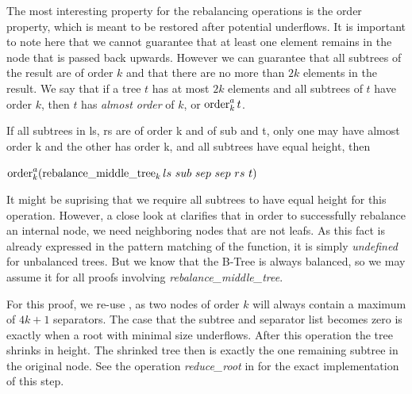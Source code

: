 The most interesting property for the rebalancing operations is the order property,
which is meant to be restored after potential underflows.
It is important to note here that we cannot guarantee
that at least one element remains in the node that
is passed back upwards.
However we can guarantee that all subtrees of the result are of order $k$
and that there are no more than $2k$ elements in the result.
We say that if a tree $t$ has at most $2k$ elements
and all subtrees of $t$ have order $k$, then $t$ has
 \textit{almost order} of $k$, or $\operatorname{order}^a_k t$.

\begin{lemma}
    If all subtrees in ls, rs are of order k 
    and of sub and t, only one may have almost order k and the other has order k,
    and all subtrees have equal height, then \\
    \begin{center}
    $\order^a_k (\rebalancemt_k ls\ sub\ sep\ sep\ rs\ t)$
    \end{center}
\end{lemma}

It might be suprising that we require all subtrees to have equal height
for this operation.
However, a close look at  clarifies that
in order to successfully rebalance an internal node, we need neighboring
nodes that are not leafs.
As this fact is already expressed in the pattern matching of the function,
it is simply \textit{undefined} for unbalanced trees.
But we know that the B-Tree is always balanced, so we may assume it for all proofs
involving \textit{rebalance\_middle\_tree}.

For this proof, we re-use ,
as two nodes of order $k$ will always contain
a maximum of $4k+1$ separators.
The case that the subtree and separator list becomes zero
is exactly when a root with minimal size underflows.
After this operation the tree shrinks in height.
The shrinked tree then is exactly the one remaining subtree in the original node.
See the operation \textit{reduce\_root} in  for the exact implementation
of this step.

